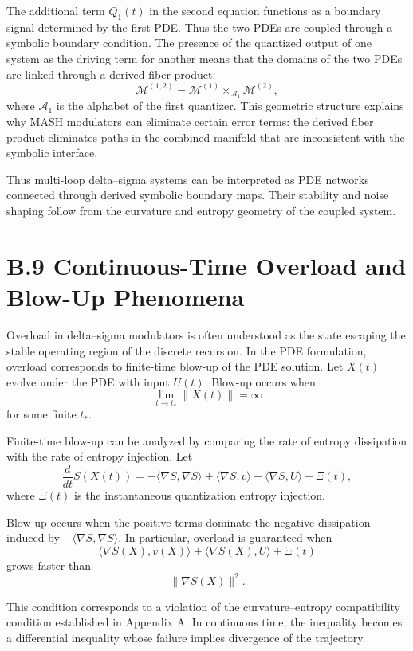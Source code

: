 The additional term \(Q_{1}(t)\) in the second equation functions as a boundary signal determined by the first PDE. Thus the two PDEs are coupled through a symbolic boundary condition. The presence of the quantized output of one system as the driving term for another means that the domains of the two PDEs are linked through a derived fiber product:
\[
\mathcal{M}^{(1,2)} 
= \mathcal{M}^{(1)} \times_{\mathcal{A}_{1}} \mathcal{M}^{(2)},
\]
where \(\mathcal{A}_{1}\) is the alphabet of the first quantizer. This geometric structure explains why MASH modulators can eliminate certain error terms: the derived fiber product eliminates paths in the combined manifold that are inconsistent with the symbolic interface.

Thus multi-loop delta–sigma systems can be interpreted as PDE networks connected through derived symbolic boundary maps. Their stability and noise shaping follow from the curvature and entropy geometry of the coupled system.

\section{B.9 Continuous-Time Overload and Blow-Up Phenomena}

Overload in delta–sigma modulators is often understood as the state escaping the stable operating region of the discrete recursion. In the PDE formulation, overload corresponds to finite-time blow-up of the PDE solution. Let \(X(t)\) evolve under the PDE with input \(U(t)\). Blow-up occurs when
\[
\lim_{t\to t_{\ast}} \|X(t)\| = \infty
\]
for some finite \(t_{\ast}\).

Finite-time blow-up can be analyzed by comparing the rate of entropy dissipation with the rate of entropy injection. Let
\[
\frac{d}{dt} S(X(t)) = -\langle \nabla S, \nabla S\rangle + \langle \nabla S, v\rangle + \langle \nabla S, U\rangle + \Xi(t),
\]
where \(\Xi(t)\) is the instantaneous quantization entropy injection.

Blow-up occurs when the positive terms dominate the negative dissipation induced by \(-\langle\nabla S,\nabla S\rangle\). In particular, overload is guaranteed when
\[
\langle \nabla S(X), v(X) \rangle + \langle \nabla S(X), U \rangle + \Xi(t)
\]
grows faster than
\[
\|\nabla S(X)\|^{2}.
\]

This condition corresponds to a violation of the curvature–entropy compatibility condition established in Appendix A. In continuous time, the inequality becomes a differential inequality whose failure implies divergence of the trajectory.

